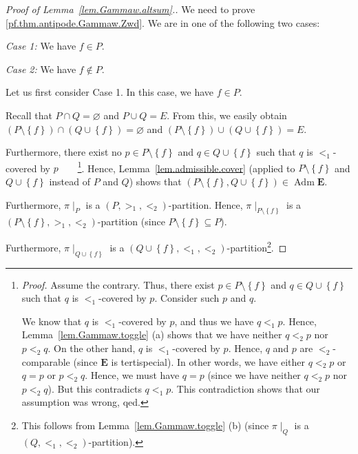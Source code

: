 \documentclass[12pt]{article}
\theoremstyle{plain}
\theoremstyle{definition}
\theoremstyle{remark}
\newcommand{\Adm}{\operatorname{Adm}}
\newcommand{\EE}{{\mathbf{E}}}
\begin{document}
\begin{proof}[Proof of Lemma~\ref{lem.Gammaw.altsum}.]
We need to prove \eqref{pf.thm.antipode.Gammaw.Zwd}. We are in one of the
following two cases:

\textit{Case 1:} We have $f\in P$.

\textit{Case 2:} We have $f\notin P$.

Let us first consider Case 1. In this case, we have $f\in P$.

Recall that $P\cap Q=\varnothing$ and $P\cup Q=E$. From this, we easily obtain
$\left(  P\setminus\left\{  f\right\}  \right)  \cap\left(  Q\cup\left\{
f\right\}  \right)  =\varnothing$ and $\left(  P\setminus\left\{  f\right\}
\right)  \cup\left(  Q\cup\left\{  f\right\}  \right)  =E$.

Furthermore, there exist no $p\in P\setminus\left\{  f\right\}  $ and $q\in
Q\cup\left\{  f\right\}  $ such that $q$ is $<_{1}$-covered by
$p$\ \ \ \ \footnote{\textit{Proof.}
Assume the contrary. Thus, there exist $p\in
P\setminus\left\{  f\right\}  $ and $q\in Q\cup\left\{  f\right\}  $ such that
$q$ is $<_{1}$-covered by $p$. Consider such $p$ and $q$.
\par
We know that $q$ is $<_{1}$-covered by $p$, and thus we have $q<_{1}p$.
Hence, Lemma~\ref{lem.Gammaw.toggle} (a) shows that
we have neither $q <_2 p$ nor $p <_2 q$.
On the other hand,
$q$ is $<_{1}$-covered by $p$. Hence, $q$ and $p$ are
$<_{2}$-comparable (since $\EE$ is tertispecial).
In other words, we have either $q <_2 p$ or $q = p$ or $p <_2 q$.
Hence, we must have $q = p$ (since we have neither $q <_2 p$
nor $p <_2 q$). But this contradicts $q <_1 p$.
This contradiction shows that our
assumption was wrong, qed.}. Hence, Lemma~\ref{lem.admissible.cover} (applied
to $P\setminus\left\{  f\right\}  $ and $Q\cup\left\{  f\right\}  $ instead of
$P$ and $Q$) shows that $\left(  P\setminus\left\{  f\right\}  ,Q\cup\left\{
f\right\}  \right)  \in \Adm \EE$.

Furthermore, $\pi\mid_{P}$ is a $\left(  P,>_{1},<_{2}\right)  $-partition.
Hence, $\pi\mid_{P\setminus\left\{  f\right\}  }$ is a $\left(
P\setminus\left\{  f\right\}  ,>_{1},<_{2}\right)  $-partition (since
$P\setminus\left\{  f\right\}  \subseteq P$).

Furthermore, $\pi\mid_{Q\cup\left\{  f\right\}  }$ is a $\left(  Q\cup\left\{
f\right\}  ,<_{1},<_{2}\right)  $-partition\footnote{This follows from
Lemma~\ref{lem.Gammaw.toggle} (b) (since $\pi\mid_Q$ is a
$\left(Q, <_1, <_2\right)$-partition).}.


\end{proof}
\end{document}
